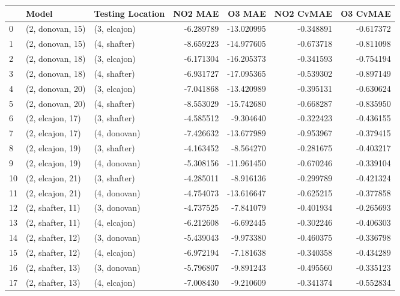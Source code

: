 \begin{tabular}{lllrrrr}
\toprule
{} &             Model & Testing Location &    NO2 MAE &     O3 MAE &  NO2 CvMAE &  O3 CvMAE \\
\midrule
0  &  (2, donovan, 15) &     (3, elcajon) &  -6.289789 & -13.020995 &  -0.348891 & -0.617372 \\
1  &  (2, donovan, 15) &     (4, shafter) &  -8.659223 & -14.977605 &  -0.673718 & -0.811098 \\
2  &  (2, donovan, 18) &     (3, elcajon) &  -6.171304 & -16.205373 &  -0.341593 & -0.754194 \\
3  &  (2, donovan, 18) &     (4, shafter) &  -6.931727 & -17.095365 &  -0.539302 & -0.897149 \\
4  &  (2, donovan, 20) &     (3, elcajon) &  -7.041868 & -13.420989 &  -0.395131 & -0.630624 \\
5  &  (2, donovan, 20) &     (4, shafter) &  -8.553029 & -15.742680 &  -0.668287 & -0.835950 \\
6  &  (2, elcajon, 17) &     (3, shafter) &  -4.585512 &  -9.304640 &  -0.322423 & -0.436155 \\
7  &  (2, elcajon, 17) &     (4, donovan) &  -7.426632 & -13.677989 &  -0.953967 & -0.379415 \\
8  &  (2, elcajon, 19) &     (3, shafter) &  -4.163452 &  -8.564270 &  -0.281675 & -0.403217 \\
9  &  (2, elcajon, 19) &     (4, donovan) &  -5.308156 & -11.961450 &  -0.670246 & -0.339104 \\
10 &  (2, elcajon, 21) &     (3, shafter) &  -4.285011 &  -8.916136 &  -0.299789 & -0.421324 \\
11 &  (2, elcajon, 21) &     (4, donovan) &  -4.754073 & -13.616647 &  -0.625215 & -0.377858 \\
12 &  (2, shafter, 11) &     (3, donovan) &  -4.737525 &  -7.841079 &  -0.401934 & -0.265693 \\
13 &  (2, shafter, 11) &     (4, elcajon) &  -6.212608 &  -6.692445 &  -0.302246 & -0.406303 \\
14 &  (2, shafter, 12) &     (3, donovan) &  -5.439043 &  -9.973380 &  -0.460375 & -0.336798 \\
15 &  (2, shafter, 12) &     (4, elcajon) &  -6.972194 &  -7.181638 &  -0.340358 & -0.434289 \\
16 &  (2, shafter, 13) &     (3, donovan) &  -5.796807 &  -9.891243 &  -0.495560 & -0.335123 \\
17 &  (2, shafter, 13) &     (4, elcajon) &  -7.008430 &  -9.210609 &  -0.341374 & -0.552834 \\

\end{tabular}
